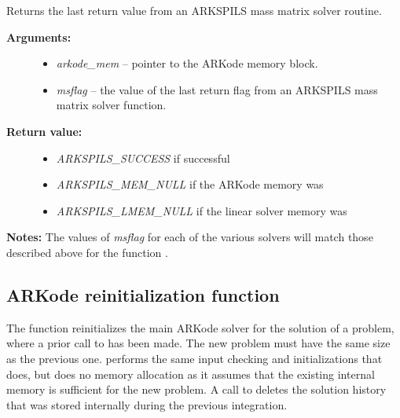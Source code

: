 \documentclass[letterpaper,10pt,english]{sphinxmanual}
\begin{document}
\begin{fulllineitems}
\label{c_interface/User_callable:ARKSpilsGetLastMassFlag}
Returns the last return value from an ARKSPILS mass matrix solver routine.
\begin{description}
\item[{\textbf{Arguments:}}] \leavevmode\begin{itemize}
\item {} 
\emph{arkode\_mem} -- pointer to the ARKode memory block.

\item {} 
\emph{msflag} -- the value of the last return flag from an
ARKSPILS mass matrix solver function.

\end{itemize}

\item[{\textbf{Return value:}}] \leavevmode\begin{itemize}
\item {} 
\emph{ARKSPILS\_SUCCESS} if successful

\item {} 
\emph{ARKSPILS\_MEM\_NULL} if the ARKode memory was 

\item {} 
\emph{ARKSPILS\_LMEM\_NULL} if the linear solver memory was 

\end{itemize}

\end{description}

\textbf{Notes:} The values of \emph{msflag} for each of the various solvers
will match those described above for the function
{\hyperref[c_interface/User_callable:ARKSpilsGetLastFlag]{}}.

\end{fulllineitems}



\subsection{ARKode reinitialization function}
\label{c_interface/User_callable:cinterface-reinitialization}\label{c_interface/User_callable:arkode-reinitialization-function}
The function {\hyperref[c_interface/User_callable:ARKodeReInit]{}} reinitializes the main ARKode
solver for the solution of a problem, where a prior call to
{\hyperref[c_interface/User_callable:ARKodeInit]{}} has been made. The new problem must have the
same size as the previous one.  {\hyperref[c_interface/User_callable:ARKodeReInit]{}} performs the
same input checking and initializations that {\hyperref[c_interface/User_callable:ARKodeInit]{}}
does, but does no memory allocation as it assumes that the existing
internal memory is sufficient for the new problem.  A call to
{\hyperref[c_interface/User_callable:ARKodeReInit]{}} deletes the solution history that was stored
internally during the previous integration.
\end{document}
